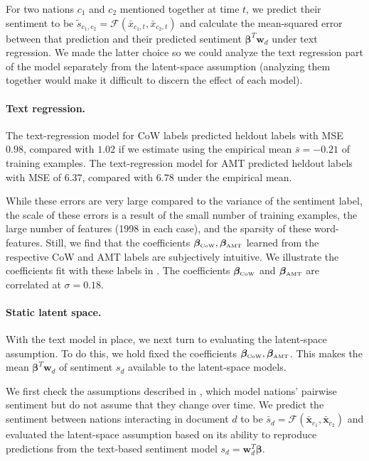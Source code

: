 For two nations $c_1$ and $c_2$ mentioned together at time $t$, we
predict their sentiment to be $\tilde s_{c_1, c_2} = \mathcal{F}(\bar
x_{c_1,t}, \bar x_{c_2, t})$ and calculate the mean-squared error
between that prediction and their predicted sentiment $\bm \beta^T \bm
w_d$ under text regression. We made the latter choice so we could
analyze the text regression part of the model separately from the
latent-space assumption (analyzing them together would make it
difficult to discern the effect of each model).

\paragraph{Text regression.} The text-regression model for CoW labels
predicted heldout labels with MSE $0.98$, compared with $1.02$ if we
estimate using the empirical mean $\bar s=-0.21$ of training
examples. The text-regression model for AMT predicted heldout labels
with MSE of $6.37$, compared with $6.78$ under the empirical mean.

While these errors are very large compared to the variance of the
sentiment label, the scale of these errors is a result of the small
number of training examples, the large number of features (1998 in
each case), and the sparsity of these word-features.  Still, we find that
the coefficients $\bm \beta_{\mbox{\tiny CoW}}, \bm \beta_{\mbox{\tiny
    AMT}}$ learned from the respective CoW and AMT labels are
subjectively intuitive.  We illustrate the coefficients fit with
these labels in .  The coefficients $\bm
\beta_{\mbox{\tiny CoW}}$ and $\bm \beta_{\mbox{\tiny AMT}}$ are
correlated at $\sigma=0.18$.

\paragraph{Static latent space.}
With the text model in place, we next turn to evaluating the
latent-space assumption.  To do this, we hold fixed the coefficients
$\bm \beta_{\mbox{\tiny CoW}}, \bm \beta_{\mbox{\tiny AMT}}$.  This
makes the mean $\bm \beta^T \bm w_d$ of sentiment $s_d$ available to
the latent-space models.

We first check the assumptions described in
, which model nations' pairwise
sentiment but do not assume that they change over time.  We predict
the sentiment between nations interacting in document $d$ to be
$\bar s_d = \mathcal{F}(\bm \bar x_{c_1}, \bm \bar x_{c_2})$ and
evaluated the latent-space assumption based on its ability to
reproduce predictions from the text-based sentiment model $s_d = \bm
w_d^T \bm \beta$.

